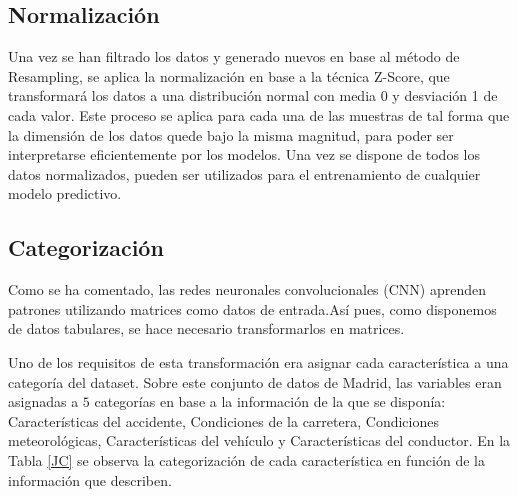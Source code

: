 \subsection*{Normalización}



Una vez se han filtrado los datos y generado nuevos en base al método de Resampling, se aplica la normalización en base a la técnica Z-Score, que transformará los datos a una distribución normal con media 0 y desviación 1 de cada valor. Este proceso se aplica para cada una de las muestras de tal forma que la dimensión de los datos quede bajo la misma magnitud, para poder ser  interpretarse eficientemente por los modelos. Una vez se dispone de todos los datos normalizados, pueden ser utilizados para el entrenamiento de cualquier modelo predictivo.


\subsection*{Categorización}

Como se ha comentado, las redes neuronales convolucionales (CNN) aprenden patrones utilizando matrices como datos de entrada.Así pues, como disponemos de datos tabulares, se hace necesario transformarlos en matrices.

Uno de los requisitos de esta transformación era asignar cada característica a una categoría del dataset. Sobre este conjunto de datos de Madrid, las variables eran asignadas a $5$ categorías en base a la información de la que se disponía: Características del accidente, Condiciones de la carretera, Condiciones meteorológicas, Características del vehículo y Características del conductor. En la Tabla \ref{JC} se observa la categorización de cada característica en función de la información que describen.


